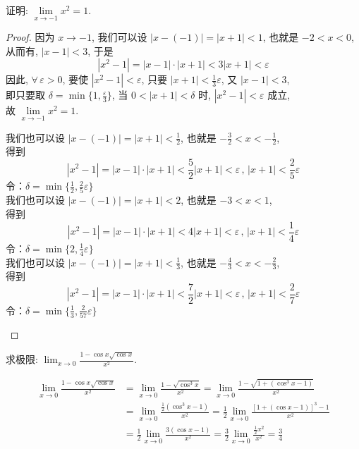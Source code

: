 \documentclass[color=green,titlestyle=hang]{elegantbook}%
\begin{document}
\begin{example}
证明: $\lim\limits_{x\to-1}x^2=1$.	
\end{example}\begin{proof}
因为 $x\to-1$, 我们可以设 $|x-(-1)|=|x+1|<1$, 也就是 $-2<x<0$,\\
从而有, $|x-1|<3$, 于是\[|x^2-1|=|x-1|\cdot|x+1|<3|x+1|<\varepsilon\]
因此, $\forall \,\varepsilon>0$, 要使 $|x^2-1|<\varepsilon$, 只要 $|x+1|<\tfrac{1}{3}\varepsilon$, 又 $|x-1|<3$,\\
即只要取 $\delta=\min\{1,\tfrac{\varepsilon}{3}\}$,
当 $0<|x+1|<\delta$ 时, $|x^2-1|<\varepsilon$ 成立, \\
故 $\lim\limits_{x\to-1}x^2=1$.
\begin{remark}
我们也可以设 $|x-(-1)|=|x+1|<\frac{1}{2}$, 也就是 $-\frac{3}{2}<x<-\frac{1}{2}$,\\
得到\[|x^2-1|=|x-1|\cdot|x+1|<\frac{5}{2}|x+1|<\varepsilon\,,\,|x+1|<\frac{2}{5}\varepsilon\]
令：$\delta=\min\{\tfrac{1}{2},\tfrac{2}{5}\varepsilon\}$\\
我们也可以设 $|x-(-1)|=|x+1|<2$, 也就是 $-3<x<1$,\\
得到\[|x^2-1|=|x-1|\cdot|x+1|<4|x+1|<\varepsilon\,,\,|x+1|<\frac{1}{4}\varepsilon\]
令：$\delta=\min\{2,\tfrac{1}{4}\varepsilon\}$\\
我们也可以设 $|x-(-1)|=|x+1|<\frac{1}{3}$, 也就是 $-\frac{4}{3}<x<-\frac{2}{3}$,\\
得到\[|x^2-1|=|x-1|\cdot|x+1|<\frac{7}{2}|x+1|<\varepsilon\,,\,|x+1|<\frac{2}{7}\varepsilon\]
令：$\delta=\min\{\tfrac{1}{3},\tfrac{2}{57}\varepsilon\}$
\end{remark}
\end{proof}


\begin{example}
求极限: $\lim_{x\to0}\frac{1-\cos x\sqrt{\cos x}}{x^2}$.
\end{example}\begin{solution}
\begin{align*}
\lim_{x\to0}\frac{1-\cos x\sqrt{\cos x}}{x^2}
&=\lim_{x\to0}\frac{1-\sqrt{\cos^3x}}{x^2}=\lim_{x\to0}\frac{1-\sqrt{1+(\cos^3x-1)}}{x^2}\\
&=\lim_{x\to0}\frac{\frac{1}{2}(\cos^3x-1)}{x^2}=\frac{1}{2}\lim_{x\to0}\frac{[1+(\cos x-1)]^3-1}{x^2}\\
&=\frac{1}{2}\lim_{x\to0}\frac{3(\cos x-1)}{x^2}=\frac{3}{2}\lim_{x\to0}\frac{\frac{1}{2}x^2}{x^2}=\frac{3}{4}
\end{align*}
\end{solution}
\end{document}
